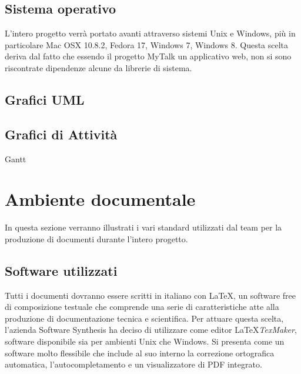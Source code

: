 \subsection{Sistema operativo}
L'intero progetto verrà portato avanti attraverso sistemi Unix e Windows, più in particolare Mac OSX 10.8.2, Fedora 17, Windows 7, Windows 8. Questa scelta deriva dal fatto che essendo il progetto MyTalk un applicativo web, non si sono riscontrate dipendenze alcune da librerie di sistema.

\subsection{Grafici UML}

\subsection{Grafici di Attività}
Gantt

\newpage
\section{Ambiente documentale}
In questa sezione verranno illustrati i vari standard utilizzati dal team per la produzione di documenti durante l'intero progetto. 

\subsection{Software utilizzati}
Tutti i documenti dovranno essere scritti in italiano con \LaTeX, un software free di composizione testuale che comprende una serie di caratteristiche atte alla produzione di documentazione tecnica e scientifica.
\newline
Per attuare questa scelta, l'azienda Software Synthesis ha deciso di utilizzare come editor \LaTeX \textit{TexMaker}, software disponibile sia per ambienti Unix che Windows. Si presenta come un software molto flessibile che include al suo interno la correzione ortografica automatica, l'autocompletamento e un visualizzatore di PDF integrato. 

